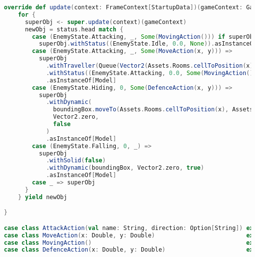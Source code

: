 \begin{lstlisting}[language=Scala]
  override def update(context: FrameContext[StartupData])(gameContext: GameContext): Outcome[Model] =
    for {
      superObj <- super.update(context)(gameContext)
      newObj = status.head match {
        case (EnemyState.Attacking, _, Some(MovingAction())) if superObj.path.length == 0 =>
          superObj.withStatus((EnemyState.Idle, 0.0, None)).asInstanceOf[Model]
        case (EnemyState.Attacking, _, Some(MoveAction(x, y))) =>
          superObj
            .withTraveller(Queue(Vector2(Assets.Rooms.cellToPosition(x), Assets.Rooms.cellToPosition(y))))
            .withStatus((EnemyState.Attacking, 0.0, Some(MovingAction())))
            .asInstanceOf[Model]
        case (EnemyState.Hiding, 0, Some(DefenceAction(x, y))) =>
          superObj
            .withDynamic(
              boundingBox.moveTo(Assets.Rooms.cellToPosition(x), Assets.Rooms.cellToPosition(y)),
              Vector2.zero,
              false
            )
            .asInstanceOf[Model]
        case (EnemyState.Falling, 0, _) =>
          superObj
            .withSolid(false)
            .withDynamic(boundingBox, Vector2.zero, true)
            .asInstanceOf[Model]
        case _ => superObj
      }
    } yield newObj

}

case class AttackAction(val name: String, direction: Option[String]) extends EnemyAction
case class MoveAction(x: Double, y: Double)                          extends EnemyAction
case class MovingAction()                                            extends EnemyAction
case class DefenceAction(x: Double, y: Double)                       extends EnemyAction

\end{lstlisting}